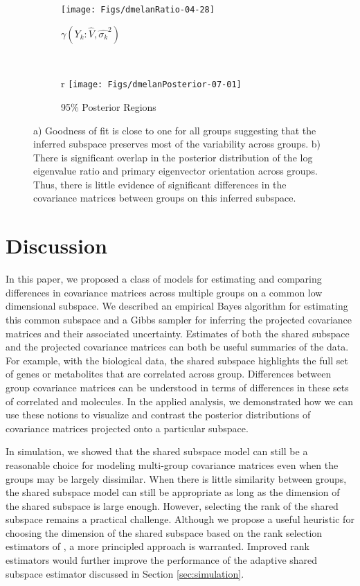 \documentclass[12pt]{article}
\begin{document}
\begin{figure}[t]
    \centering
    \begin{subfigure}[b]{0.45\textwidth}
        \texttt{[image: Figs/dmelanRatio-04-28]}
        \caption{$\gamma(Y_k: \hat{V}, \hat{\sigma_k}^2)$}
        \label{fig:dmelanRatio}
      \end{subfigure}
    ~ %
    \begin{subfigure}[b]{0.45\textwidth}r
        \texttt{[image: Figs/dmelanPosterior-07-01]}
        \caption{95\% Posterior Regions}
        \label{fig:dmelanPosterior}
    \end{subfigure}
    \caption{a) Goodness of fit is close to one for all groups
      suggesting that the inferred subspace preserves most of the
      variability across groups. b) There is significant overlap in
      the posterior distribution of the log eigenvalue ratio and primary
      eigenvector orientation across groups. Thus, there is little
      evidence of significant differences in the covariance matrices
      between groups on this inferred subspace.  }
\end{figure}

\section{Discussion}

In this paper, we proposed a class of models for estimating and
comparing differences in covariance matrices across multiple groups on
a common low dimensional subspace.  We described an empirical Bayes
algorithm for estimating this common subspace and a Gibbs sampler for
inferring the projected covariance matrices and their associated
uncertainty.  Estimates of both the shared subspace and the projected
covariance matrices can both be useful summaries of the data.  For
example, with the biological data, the shared subspace highlights the
full set of genes or metabolites that are correlated across group.
Differences between group covariance matrices can be understood in
terms of differences in these sets of correlated and
molecules.  In the applied analysis, we demonstrated how
we can use these notions to visualize and contrast the posterior
distributions of covariance matrices projected onto a particular
subspace.

In simulation, we showed that the shared subspace model can still be a
reasonable choice for modeling multi-group covariance matrices even
when the groups may be largely dissimilar.  When there is little
similarity between groups, the shared subspace model can still be appropriate as
long as the dimension of the shared subspace is large enough.
However, selecting the rank of the shared subspace remains a practical
challenge.  Although we propose a useful heuristic for choosing the
dimension of the shared subspace based on the rank selection
estimators of \citet{Gavish2014}, a more principled approach is
warranted.  Improved rank estimators would further improve the
performance of the adaptive shared subspace estimator discussed in
Section \ref{sec:simulation}.
\end{document}

